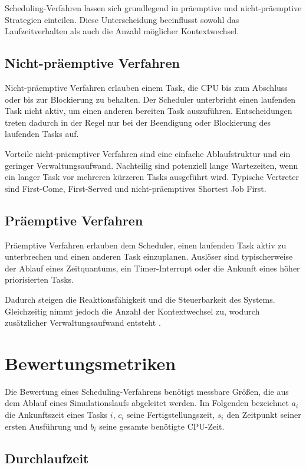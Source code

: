 Scheduling-Verfahren lassen sich grundlegend in präemptive und nicht-präemptive Strategien einteilen. Diese Unterscheidung beeinflusst sowohl das Laufzeitverhalten als auch die Anzahl möglicher Kontextwechsel.

\subsection{Nicht-präemptive Verfahren}

Nicht-präemptive Verfahren erlauben einem Task, die CPU bis zum Abschluss oder bis zur Blockierung zu behalten. Der Scheduler unterbricht einen laufenden Task nicht aktiv, um einen anderen bereiten Task auszuführen. Entscheidungen treten dadurch in der Regel nur bei der Beendigung oder Blockierung des laufenden Tasks auf.

Vorteile nicht-präemptiver Verfahren sind eine einfache Ablaufstruktur und ein geringer Verwaltungsaufwand. Nachteilig sind potenziell lange Wartezeiten, wenn ein langer Task vor mehreren kürzeren Tasks ausgeführt wird. Typische Vertreter sind First-Come, First-Served und nicht-präemptives Shortest Job First.

\subsection{Präemptive Verfahren}

Präemptive Verfahren erlauben dem Scheduler, einen laufenden Task aktiv zu unterbrechen und einen anderen Task einzuplanen. Auslöser sind typischerweise der Ablauf eines Zeitquantums, ein Timer-Interrupt oder die Ankunft eines höher priorisierten Tasks.

Dadurch steigen die Reaktionsfähigkeit und die Steuerbarkeit des Systems. Gleichzeitig nimmt jedoch die Anzahl der Kontextwechsel zu, wodurch zusätzlicher Verwaltungsaufwand entsteht \cite{tanenbaum_moderne_betriebssysteme_de}.

\section{Bewertungsmetriken}

Die Bewertung eines Scheduling-Verfahrens benötigt messbare Größen, die aus dem Ablauf eines Simulationslaufs abgeleitet werden. Im Folgenden bezeichnet $a_i$ die Ankunftszeit eines Tasks $i$, $c_i$ seine Fertigstellungszeit, $s_i$ den Zeitpunkt seiner ersten Ausführung und $b_i$ seine gesamte benötigte CPU-Zeit.

\subsection{Durchlaufzeit}

